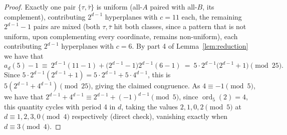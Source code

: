 \documentclass{article}
\theoremstyle{plain}
\theoremstyle{definition}
\theoremstyle{remark}
\newcommand{\F}{\mathbb{F}}
\DeclareMathOperator{\Circ}{Circ}
\DeclareMathOperator{\ord}{ord}
\begin{document}
\begin{proof}
Exactly one pair $\{\tau,\bar\tau\}$ is uniform (all-$A$ paired with all-$B$, its complement), contributing $2^{d-1}$ hyperplanes with $c=11$ each, the remaining $2^{d-1}-1$ pairs are mixed (both $\tau,\bar\tau$ hit both classes, since a pattern that is not uniform, upon complementing every coordinate, remains non-uniform), each contributing $2^{d-1}$ hyperplanes with $c=6$. By part 4 of Lemma~\ref{lem:reduction} we have that
\[
a_d(5)-1\ \equiv\ 2^{d-1}(11-1)+\big(2^{d-1}-1\big)2^{d-1}(6-1)\  =\ 5\cdot2^{d-1}\big(2^{d-1}+1\big)\pmod{25}.
\]
Since $5\cdot2^{d-1}(2^{d-1}+1)=5\cdot2^{d-1}+5\cdot4^{d-1}$, this is $5(2^{d-1}+4^{d-1})\pmod{25}$, giving the claimed congruence. As $4\equiv-1\pmod5$, we have that $2^{d-1}+4^{d-1}\equiv2^{d-1}+(-1)^{d-1}\pmod5$, since $\ord_5(2)=4$, this quantity cycles with period 4 in $d$, taking the values $2,1,0,2\pmod5$ at $d\equiv1,2,3,0\pmod4$ respectively (direct check), vanishing exactly when $d\equiv3\pmod4$.
\end{proof}







\end{document}

